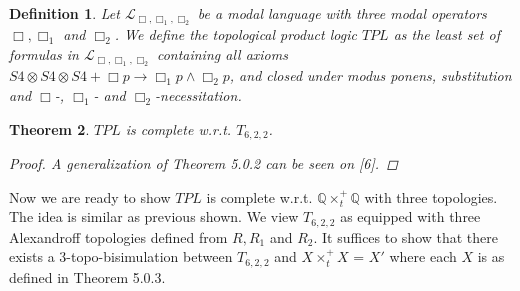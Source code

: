 \documentclass[12pt, a4paper]{scrartcl}
\newtheorem{definition}{Definition}[subsection]
\newtheorem{theorem}[definition]{Theorem}
\begin{document}
\begin{definition}
    Let $\mathcal{L}_{\Box,\Box_1,\Box_2}$ be a modal language with three modal operators $\Box, \Box_1$ and $\Box_2$.
    We define the topological product logic $TPL$ as the least set of formulas in $\mathcal{L}_{\Box,\Box_1,\Box_2}$ containing all axioms
    $S4 \otimes S4 \otimes S4 + \Box p \rightarrow \Box_1 p \land \Box_2 p$, and closed under modus ponens, substitution and $\Box$-, $\Box_1$- and $\Box_2$-necessitation.  
\end{definition}

\begin{theorem}
    $TPL$ is complete w.r.t. $T_{6,2,2}$.
    \begin{proof}
        A generalization of Theorem 5.0.2 can be seen on [6].
    \end{proof}
\end{theorem}

Now we are ready to show $TPL$ is complete w.r.t. $\mathbb{Q} \times^+_t \mathbb{Q}$ with three topologies. The idea is similar as previous shown.
We view $T_{6,2,2}$ as equipped with three Alexandroff topologies defined from $R, R_1$ and $R_2$. It suffices to show 
that there exists a 3-topo-bisimulation between $T_{6,2,2}$ and $X \times^+_t X$ = $X'$ where each $X$ is as defined in Theorem 5.0.3. 
\end{document}
